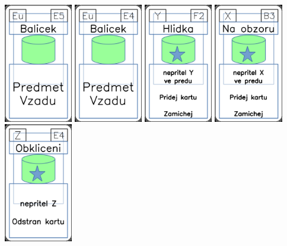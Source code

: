 \documentclass[a4paper]{article}
\begin{document}
	\includegraphics[width=3.0cm]{img-4_24}
	\includegraphics[width=3.0cm]{img-4_23}
	\includegraphics[width=3.0cm]{img-5_26}
	\includegraphics[width=3.0cm]{img-5_7}
	\includegraphics[width=3.0cm]{img-5_53}
\end{document}
